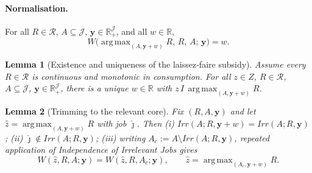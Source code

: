 \documentclass[12pt]{article}
\DeclareMathOperator*{\argmax}{arg\,max}
\newtheorem{lemma}{Lemma}
\begin{document}
{ \color{red}
\paragraph{Normalisation.}
For all $R\in\mathcal R$, $A\subseteq\mathcal J$, $\mathbf y\in\mathbb R_+^{\mathcal J}$, and all $w\in\mathbb R$,
\begin{equation}
W\!\big(\argmax_{(A,\mathbf y+w)}R,\,R,\,A;\,\mathbf y\big)=w. \label{norm_lf}
\end{equation}

\begin{lemma}[Existence and uniqueness of the laissez-faire subsidy]
\label{lem:w_exists}
Assume every $R\in\mathcal R$ is continuous and monotonic in consumption. For all
$z\in Z$, $R\in\mathcal R$, $A\subseteq\mathcal J$, $\mathbf y\in\mathbb R_+^{\mathcal J}$,
there is a unique $w\in\mathbb R$ with
$z\,I\,\argmax_{(A,\mathbf y+w)}R$.
\end{lemma}

\begin{lemma}[Trimming to the relevant core]
\label{lem:trim}
Fix $(R,A,\mathbf y)$ and let $\hat z=\argmax_{(A,\mathbf y+w)}R$ with job $\hat\jmath$.
Then (i) $Irr(A;R,\mathbf y+w)=Irr(A;R,\mathbf y)$; (ii) $\hat\jmath\notin Irr(A;R,\mathbf y)$;
(iii) writing $A_c:=A\setminus Irr(A;R,\mathbf y)$, repeated application of Independence
of Irrelevant Jobs gives
\begin{equation*}
W(\hat z,R,A;\mathbf y)=W(\hat z,R,A_c;\mathbf y),
\qquad \hat z=\argmax_{(A_c,\mathbf y+w)}R.
\end{equation*}
\end{lemma}

}
\end{document}
